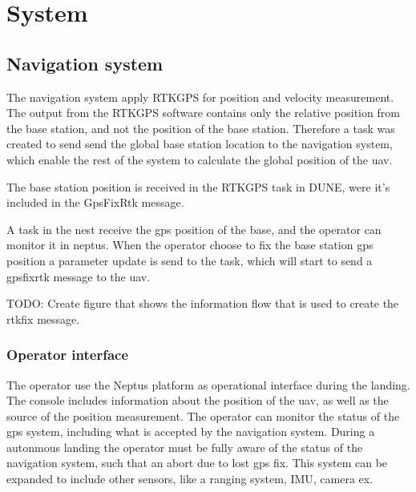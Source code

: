 \chapter{System}

\section{Navigation system}
The navigation system apply RTKGPS for position and velocity measurement. The output from the RTKGPS software contains only the relative position from the base station, and not the position of the base station. Therefore a task was created to send send the global base station location to the navigation system, which enable the rest of the system to calculate the global position of the uav. 

The base station position is received in the RTKGPS task in DUNE, were it's included in the GpsFixRtk message.

A task in the nest receive the gps position of the base, and the operator can monitor it in neptus. When the operator choose to fix the base station gps position a parameter update is send to the task, which will start to send a gpsfixrtk message to the uav. 

TODO: Create figure that shows the information flow that is used to create the rtkfix message.
\subsection{Operator interface}
The operator use the Neptus platform as operational interface during the landing. The console includes information about the position of the uav, as well as the source of the position measurement. The operator can monitor the status of the gps system, including what is accepted by the navigation system. During a autonmous landing the operator must be fully aware of the status of the navigation system, such that an abort due to lost gps fix. This system can be expanded to include other sensors, like a ranging system, IMU, camera ex.

